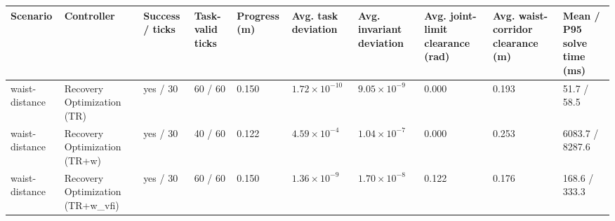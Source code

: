 \begin{tabular}{llllllllll}
\toprule
Scenario & Controller & Success / ticks & Task-valid ticks & Progress (m) & Avg. task deviation & Avg. invariant deviation & Avg. joint-limit clearance (rad) & Avg. waist-corridor clearance (m) & Mean / P95 solve time (ms) \\
\midrule
waist-distance & Recovery Optimization (TR) & yes / 30 & 60 / 60 & 0.150 & $1.72\times 10^{-10}$ & $9.05\times 10^{-9}$ & 0.000 & 0.193 & 51.7 / 58.5 \\
waist-distance & Recovery Optimization (TR+w) & yes / 30 & 40 / 60 & 0.122 & $4.59\times 10^{-4}$ & $1.04\times 10^{-7}$ & 0.000 & 0.253 & 6083.7 / 8287.6 \\
waist-distance & Recovery Optimization (TR+w\_vfi) & yes / 30 & 60 / 60 & 0.150 & $1.36\times 10^{-9}$ & $1.70\times 10^{-8}$ & 0.122 & 0.176 & 168.6 / 333.3 \\
\bottomrule
\end{tabular}
